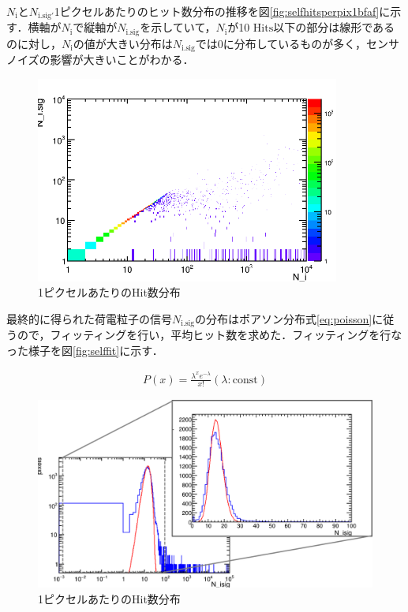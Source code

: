 $N_{\mathrm{i}}$と$N_{\mathrm{i.sig'}}$1ピクセルあたりのヒット数分布の推移を図\ref{fig:selfhitsperpix1bfaf}に示す．横軸が$N_{\mathrm{i}}$で縦軸が$N_{\mathrm{i.sig}}$を示していて，$N_{\mathrm{i}}$が10 $\mathrm{Hits}$以下の部分は線形であるのに対し，$N_{\mathrm{i}}$の値が大きい分布は$N_{\mathrm{i.sig}}$では0に分布しているものが多く，センサノイズの影響が大きいことがわかる．
\begin{figure}[h]
  \centering
  \includegraphics[width=10cm]{./figure/selfhitperpixbfaf.png}
  \caption{1ピクセルあたりのHit数分布}
  \label{fig:selfhitfreq}
\end{figure}

最終的に得られた荷電粒子の信号$N_{\mathrm{i.sig}}$の分布はポアソン分布式\ref{eq:poisson}に従うので，フィッティングを行い，平均ヒット数を求めた．フィッティングを行なった様子を図\ref{fig:selffit}に示す．

\begin{eqnarray}
  \label{eq:poisson}
  P(x) = \frac{\lambda^x e^{-\lambda}}{x!} (\lambda:\mathrm{const})
\end{eqnarray}

\begin{figure}[h]
  \centering
  \includegraphics[width=15cm]{./figure/selffit.png}
  \caption{1ピクセルあたりのHit数分布}
  \label{fig:selfhitfreq}
\end{figure}

